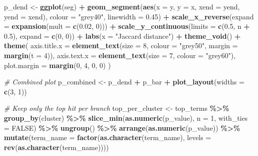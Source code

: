 \documentclass[
]{book}
\newenvironment{Shaded}{\begin{snugshade}}{\end{snugshade}}
\newcommand{\AttributeTok}[1]{\textcolor[rgb]{0.13,0.29,0.53}{#1}}
\newcommand{\CommentTok}[1]{\textcolor[rgb]{0.56,0.35,0.01}{\textit{#1}}}
\newcommand{\ConstantTok}[1]{\textcolor[rgb]{0.56,0.35,0.01}{#1}}
\newcommand{\DecValTok}[1]{\textcolor[rgb]{0.00,0.00,0.81}{#1}}
\newcommand{\FloatTok}[1]{\textcolor[rgb]{0.00,0.00,0.81}{#1}}
\newcommand{\FunctionTok}[1]{\textcolor[rgb]{0.13,0.29,0.53}{\textbf{#1}}}
\newcommand{\NormalTok}[1]{#1}
\newcommand{\OtherTok}[1]{\textcolor[rgb]{0.56,0.35,0.01}{#1}}
\newcommand{\SpecialCharTok}[1]{\textcolor[rgb]{0.81,0.36,0.00}{\textbf{#1}}}
\newcommand{\StringTok}[1]{\textcolor[rgb]{0.31,0.60,0.02}{#1}}
\begin{document}
\begin{Shaded}
\begin{Highlighting}[]
\NormalTok{  p\_dend }\OtherTok{\textless{}{-}} \FunctionTok{ggplot}\NormalTok{(seg) }\SpecialCharTok{+}
    \FunctionTok{geom\_segment}\NormalTok{(}\FunctionTok{aes}\NormalTok{(}\AttributeTok{x =}\NormalTok{ y, }\AttributeTok{y =}\NormalTok{ x, }\AttributeTok{xend =}\NormalTok{ yend, }\AttributeTok{yend =}\NormalTok{ xend),}
                 \AttributeTok{colour =} \StringTok{"grey40"}\NormalTok{, }\AttributeTok{linewidth =} \FloatTok{0.45}\NormalTok{) }\SpecialCharTok{+}
    \FunctionTok{scale\_x\_reverse}\NormalTok{(}\AttributeTok{expand =} \FunctionTok{expansion}\NormalTok{(}\AttributeTok{mult =} \FunctionTok{c}\NormalTok{(}\FloatTok{0.02}\NormalTok{, }\DecValTok{0}\NormalTok{))) }\SpecialCharTok{+}
    \FunctionTok{scale\_y\_continuous}\NormalTok{(}\AttributeTok{limits =} \FunctionTok{c}\NormalTok{(}\FloatTok{0.5}\NormalTok{, n }\SpecialCharTok{+} \FloatTok{0.5}\NormalTok{), }\AttributeTok{expand =} \FunctionTok{c}\NormalTok{(}\DecValTok{0}\NormalTok{, }\DecValTok{0}\NormalTok{)) }\SpecialCharTok{+}
    \FunctionTok{labs}\NormalTok{(}\AttributeTok{x =} \StringTok{"Jaccard distance"}\NormalTok{) }\SpecialCharTok{+}
    \FunctionTok{theme\_void}\NormalTok{() }\SpecialCharTok{+}
    \FunctionTok{theme}\NormalTok{(}
      \AttributeTok{axis.title.x =} \FunctionTok{element\_text}\NormalTok{(}\AttributeTok{size =} \DecValTok{8}\NormalTok{, }\AttributeTok{colour =} \StringTok{"grey50"}\NormalTok{, }\AttributeTok{margin =} \FunctionTok{margin}\NormalTok{(}\AttributeTok{t =} \DecValTok{4}\NormalTok{)),}
      \AttributeTok{axis.text.x  =} \FunctionTok{element\_text}\NormalTok{(}\AttributeTok{size =} \DecValTok{7}\NormalTok{, }\AttributeTok{colour =} \StringTok{"grey60"}\NormalTok{),}
      \AttributeTok{plot.margin  =} \FunctionTok{margin}\NormalTok{(}\DecValTok{0}\NormalTok{, }\DecValTok{4}\NormalTok{, }\DecValTok{0}\NormalTok{, }\DecValTok{0}\NormalTok{)}
\NormalTok{    )}

  \CommentTok{\#  Combined plot }
\NormalTok{  p\_combined }\OtherTok{\textless{}{-}}\NormalTok{ p\_dend }\SpecialCharTok{+}\NormalTok{ p\_bar }\SpecialCharTok{+}
    \FunctionTok{plot\_layout}\NormalTok{(}\AttributeTok{widths =} \FunctionTok{c}\NormalTok{(}\DecValTok{3}\NormalTok{, }\DecValTok{1}\NormalTok{))}

  \CommentTok{\#  Keep only the top hit per branch }
\NormalTok{  top\_per\_cluster }\OtherTok{\textless{}{-}}\NormalTok{ top\_terms }\SpecialCharTok{\%\textgreater{}\%}
    \FunctionTok{group\_by}\NormalTok{(cluster) }\SpecialCharTok{\%\textgreater{}\%}
    \FunctionTok{slice\_min}\NormalTok{(}\FunctionTok{as.numeric}\NormalTok{(p\_value), }\AttributeTok{n =} \DecValTok{1}\NormalTok{, }\AttributeTok{with\_ties =} \ConstantTok{FALSE}\NormalTok{) }\SpecialCharTok{\%\textgreater{}\%}
    \FunctionTok{ungroup}\NormalTok{() }\SpecialCharTok{\%\textgreater{}\%}
    \FunctionTok{arrange}\NormalTok{(}\FunctionTok{as.numeric}\NormalTok{(p\_value)) }\SpecialCharTok{\%\textgreater{}\%}
    \FunctionTok{mutate}\NormalTok{(}\AttributeTok{term\_name =} \FunctionTok{factor}\NormalTok{(}\FunctionTok{as.character}\NormalTok{(term\_name),}
                              \AttributeTok{levels =} \FunctionTok{rev}\NormalTok{(}\FunctionTok{as.character}\NormalTok{(term\_name))))}


\end{Highlighting}
\end{Shaded}
\end{document}

